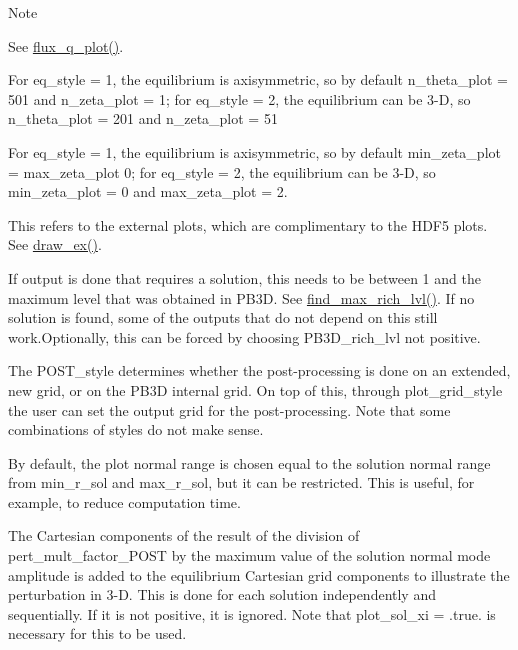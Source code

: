 \begin{DoxyNote}{Note}
\begin{DoxyEnumerate}
See \hyperlink{namespaceeq__ops_af0effe20188d46a44680c2648e4572e9}{flux\+\_\+q\+\_\+plot()}.
\item \label{page_inputs_fni19}%
%
For {\ttfamily eq\+\_\+style = 1}, the equilibrium is axisymmetric, so by default {\ttfamily n\+\_\+theta\+\_\+plot = 501} and {\ttfamily n\+\_\+zeta\+\_\+plot = 1}; for {\ttfamily eq\+\_\+style = 2}, the equilibrium can be 3-\/D, so {\ttfamily n\+\_\+theta\+\_\+plot = 201} and {\ttfamily n\+\_\+zeta\+\_\+plot = 51}
\item \label{page_inputs_fni20}%
%
For {\ttfamily eq\+\_\+style = 1}, the equilibrium is axisymmetric, so by default {\ttfamily min\+\_\+zeta\+\_\+plot = max\+\_\+zeta\+\_\+plot 0}; for {\ttfamily eq\+\_\+style = 2}, the equilibrium can be 3-\/D, so {\ttfamily min\+\_\+zeta\+\_\+plot = 0} and {\ttfamily max\+\_\+zeta\+\_\+plot = 2}.
\item \label{page_inputs_fni21}%
%
This refers to the external plots, which are complimentary to the H\+D\+F5 plots. See \hyperlink{namespaceoutput__ops_a50bfbb88cc91805469353c3ff47b3e2e}{draw\+\_\+ex()}.
\item \label{page_inputs_fni22}%
%
If output is done that requires a solution, this needs to be between 1 and the maximum level that was obtained in P\+B3D. See \hyperlink{namespacerich__ops_a58e1bed1bed5c2d0b91cc7dc5e3099d9}{find\+\_\+max\+\_\+rich\+\_\+lvl()}. If no solution is found, some of the outputs that do not depend on this still work.\+Optionally, this can be forced by choosing {\ttfamily P\+B3\+D\+\_\+rich\+\_\+lvl} not positive.
\item \label{page_inputs_fni23}%
%
The {\ttfamily P\+O\+S\+T\+\_\+style} determines whether the post-\/processing is done on an extended, new grid, or on the P\+B3D internal grid. On top of this, through {\ttfamily plot\+\_\+grid\+\_\+style} the user can set the output grid for the post-\/processing. Note that some combinations of styles do not make sense.
\item \label{page_inputs_fni24}%
%
By default, the plot normal range is chosen equal to the solution normal range from {\ttfamily min\+\_\+r\+\_\+sol} and {\ttfamily max\+\_\+r\+\_\+sol}, but it can be restricted. This is useful, for example, to reduce computation time.
\item \label{page_inputs_fni25}%
%
The Cartesian components of the result of the division of {\ttfamily pert\+\_\+mult\+\_\+factor\+\_\+\+P\+O\+ST} by the maximum value of the solution normal mode amplitude is added to the equilibrium Cartesian grid components to illustrate the perturbation in 3-\/D. This is done for each solution independently and sequentially. If it is not positive, it is ignored. Note that {\ttfamily plot\+\_\+sol\+\_\+xi = .true.} is necessary for this to be used.

\end{DoxyEnumerate}
\end{DoxyNote}
